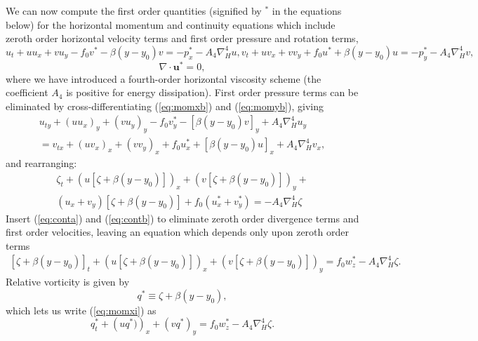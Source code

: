 \documentclass[11pt, a4paper,twoside]{article}
\newcommand{\vc}[1]{\mathbf{#1}}
\numberwithin{equation}{section}
\begin{document}
We can now compute the first order quantities (signified by ${}^*$ in the equations below) for the horizontal momentum and continuity equations which include zeroth order horizontal velocity terms and first order pressure and rotation terms,
\begin{subequations}
\begin{equation}\label{eq:momxb}
u_t + uu_x + vu_y  - f_0 v^* - \beta(y-y_0) v = -p_x^* - A_4 \nabla_H^4 u,
\end{equation}
\begin{equation}\label{eq:momyb}
v_t + uv_x + vv_y + f_0 u^* + \beta(y-y_0) u = -p_y^* - A_4 \nabla_H^4 v,
\end{equation}
\end{subequations}
\begin{equation}\label{eq:contb}
\nabla\cdot\vc{u}^* = 0,
\end{equation}
where we have introduced a fourth-order horizontal viscosity scheme (the coefficient $A_4$ is positive for energy dissipation).
First order pressure terms can be eliminated by cross-differentiating (\ref{eq:momxb}) and (\ref{eq:momyb}), giving
\begin{multline}
u_{ty} + (uu_x)_y + (vu_y)_y  - f_0 v^*_y - [\beta(y-y_0) v]_y + A_4\nabla_H^4 u_y\\
= v_{tx} + (uv_x)_x + (vv_y)_x + f_0 u^*_x + [\beta(y-y_0) u]_x + A_4\nabla_H^4 v_x,
\end{multline}
and rearranging:
\begin{multline}
\zeta_t +\left(u\left[\zeta + \beta(y-y_0)\right]\right)_x +\left(v\left[\zeta + \beta(y-y_0)\right]\right)_y + \\
(u_x + v_y)\left[\zeta + \beta(y-y_0)\right] + f_0 (u^*_x + v^*_y)  = - A_4\nabla_H^4\zeta
\end{multline}
Insert (\ref{eq:conta}) and (\ref{eq:contb}) to eliminate zeroth order divergence terms and first order velocities, leaving an equation which depends only upon zeroth order terms
\begin{multline}\label{eq:momxi}
\left[\zeta + \beta(y-y_0)\right]_t +\left(u\left[\zeta + \beta(y-y_0)\right]\right)_x +\left(v\left[\zeta + \beta(y-y_0)\right]\right)_y = f_0 w^*_z - A_4\nabla_H^4 \zeta.
\end{multline}
Relative vorticity is given by
\begin{equation}\label{eq:relvort}
q^* \equiv \zeta + \beta(y - y_0),
\end{equation}
which lets us write (\ref{eq:momxi}) as
\begin{equation}\label{eq:momxi2}
q^*_t +\left(uq^*)\right)_x +\left(vq^*\right)_y = f_0 w^*_z - A_4\nabla_H^4 \zeta.
\end{equation}
\end{document}
